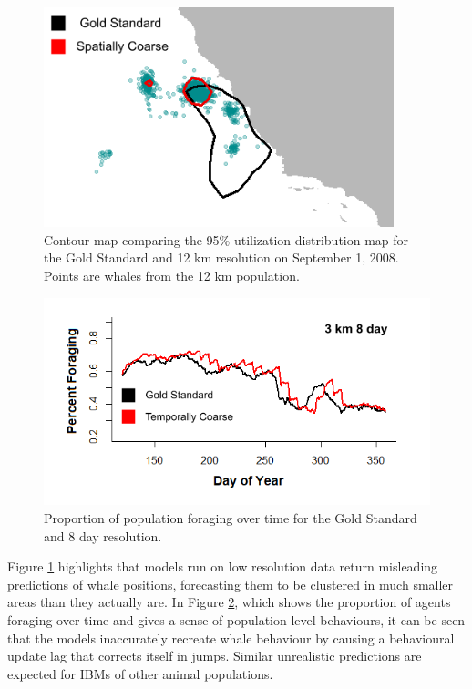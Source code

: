 \documentclass[11pt]{article}
\begin{document}
\begin{figure}[ht] \centering
    \includegraphics[width=4in]{geo_12_tmp_1_ud.png}
    \caption{Contour map comparing the 95\% utilization distribution map for the Gold Standard and 12 km resolution on September 1, 2008. Points are whales from the 12 km population.}
    \label{fig:badud}
\end{figure}
\begin{figure}[ht] \centering
    \includegraphics[width=6in]{state_geo_3_tmp_8_no_fix.png}
    \caption{Proportion of population foraging over time for the Gold Standard and 8 day resolution.}
    \label{fig:badforage}
\end{figure}

Figure \ref{fig:badud} highlights that models run on low resolution data return misleading predictions of whale positions, forecasting them to be clustered in much smaller areas than they actually are. In Figure \ref{fig:badforage}, which shows the proportion of agents foraging over time and gives a sense of population-level behaviours, it can be seen that the models inaccurately recreate whale behaviour by causing a behavioural update lag that corrects itself in jumps. Similar unrealistic predictions are expected for IBMs of other animal populations.\par
\end{document}
